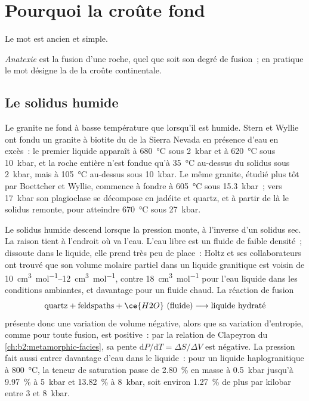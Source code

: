 \section{Pourquoi la croûte fond}\label{sec:b2:crustal-melting:why}

Le mot est ancien et simple.

\begin{definition}[Anatexie]\label{def:b2:crustal-melting:anatexis}
\emph{Anatexie} est la fusion d'une roche, quel que soit son degré de fusion~;
en pratique le mot désigne la  de la croûte continentale.
\end{definition}

\subsection*{Le solidus humide}

Le granite ne fond à basse température que lorsqu'il est humide. Stern et Wyllie ont fondu un
granite à biotite du  de la Sierra Nevada en présence d'eau en excès~: le premier liquide apparaît
à \qty{680}{\celsius} sous \qty{2}{kbar} et à \qty{620}{\celsius} sous \qty{10}{kbar}, et la
roche entière n'est fondue qu'à \qty{35}{\celsius} au-dessus du solidus sous \qty{2}{kbar}, mais
à \qty{105}{\celsius} au-dessus sous \qty{10}{kbar}. Le même granite, étudié plus tôt par
Boettcher et Wyllie, commence à fondre à \qty{605}{\celsius} sous \qty{15.3}{kbar}~; vers
\qty{17}{kbar} son plagioclase se décompose en jadéite et quartz, et à partir de là le solidus
remonte, pour atteindre \qty{670}{\celsius} sous \qty{27}{kbar}.

Le solidus humide descend lorsque la pression monte, à l'inverse d'un solidus sec. La raison tient à
l'endroit où va l'eau. L'eau libre est un fluide de faible densité~; dissoute dans le liquide, elle prend très
peu de place~: Holtz et ses collaborateurs ont trouvé que son volume molaire partiel dans un liquide
granitique est voisin de \qtyrange{10}{12}{\cubic\centi\metre\per\mole}, contre \qty{18}{\cubic\centi\metre\per\mole}
pour l'eau liquide dans les conditions ambiantes, et davantage pour un fluide chaud. La réaction de fusion
\[\text{quartz} + \text{feldspaths} + \ce{H2O}\ (\text{fluide}) \longrightarrow
\text{liquide hydraté}\]
présente donc une variation de volume négative, alors que sa variation d'entropie, comme pour toute fusion,
est positive~: par la relation de Clapeyron du \cref{ch:b2:metamorphic-facies}, sa pente
$\mathrm{d}P/\mathrm{d}T = \Delta S/\Delta V$ est négative. La pression fait aussi entrer davantage d'eau
dans le liquide~: pour un liquide haplogranitique à \qty{800}{\celsius}, la teneur de saturation passe
de \qty{2.80}{\percent} en masse à \qty{0.5}{kbar} jusqu'à \qty{9.97}{\percent} à \qty{5}{kbar} et
\qty{13.82}{\percent} à \qty{8}{kbar}, soit environ \qty{1.27}{\percent} de plus par kilobar entre 3 et
\qty{8}{kbar}.

